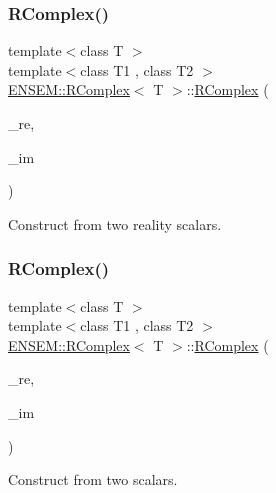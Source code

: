 \subsubsection{\texorpdfstring{RComplex()}{RComplex()}\hspace{0.1cm}{\footnotesize\ttfamily [6/8]}}
{\footnotesize\ttfamily template$<$class T $>$ \\
template$<$class T1 , class T2 $>$ \\
\mbox{\hyperlink{classENSEM_1_1RComplex}{E\+N\+S\+E\+M\+::\+R\+Complex}}$<$ T $>$\+::\mbox{\hyperlink{classENSEM_1_1RComplex}{R\+Complex}} (\begin{DoxyParamCaption}\item[{const \mbox{\hyperlink{classENSEM_1_1RScalar}{R\+Scalar}}$<$ T1 $>$ \&}]{\+\_\+re,  }\item[{const \mbox{\hyperlink{classENSEM_1_1RScalar}{R\+Scalar}}$<$ T2 $>$ \&}]{\+\_\+im }\end{DoxyParamCaption})\hspace{0.3cm}{\ttfamily [inline]}}



Construct from two reality scalars. 

\mbox{\label{classENSEM_1_1RComplex_aa67055e36f9e7d7709eb98453901b0ba}} 
\subsubsection{\texorpdfstring{RComplex()}{RComplex()}\hspace{0.1cm}{\footnotesize\ttfamily [7/8]}}
{\footnotesize\ttfamily template$<$class T $>$ \\
template$<$class T1 , class T2 $>$ \\
\mbox{\hyperlink{classENSEM_1_1RComplex}{E\+N\+S\+E\+M\+::\+R\+Complex}}$<$ T $>$\+::\mbox{\hyperlink{classENSEM_1_1RComplex}{R\+Complex}} (\begin{DoxyParamCaption}\item[{const T1 \&}]{\+\_\+re,  }\item[{const T2 \&}]{\+\_\+im }\end{DoxyParamCaption})\hspace{0.3cm}{\ttfamily [inline]}}



Construct from two scalars. 

